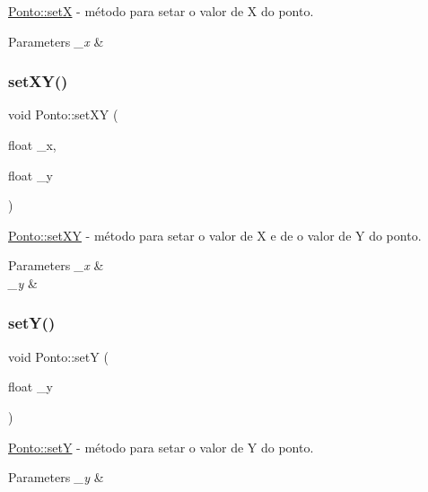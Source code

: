 \hyperlink{classPonto_a22129ad4dbf8019c479021d70a9f6774}{Ponto\+::setX} -\/ método para setar o valor de X do ponto. 


\begin{DoxyParams}{Parameters}
{\em \+\_\+x} & \\
\hline
\end{DoxyParams}
\mbox{\label{classPonto_a827488219a7da184d440f687cec49ce6}} 
\subsubsection{\texorpdfstring{set\+X\+Y()}{setXY()}}
{\footnotesize\ttfamily void Ponto\+::set\+XY (\begin{DoxyParamCaption}\item[{float}]{\+\_\+x,  }\item[{float}]{\+\_\+y }\end{DoxyParamCaption})}



\hyperlink{classPonto_a827488219a7da184d440f687cec49ce6}{Ponto\+::set\+XY} -\/ método para setar o valor de X e de o valor de Y do ponto. 


\begin{DoxyParams}{Parameters}
{\em \+\_\+x} & \\
\hline
{\em \+\_\+y} & \\
\hline
\end{DoxyParams}
\mbox{\label{classPonto_a2d9e5b9fade9d3f3f21122a2dc2f5e11}} 
\subsubsection{\texorpdfstring{set\+Y()}{setY()}}
{\footnotesize\ttfamily void Ponto\+::setY (\begin{DoxyParamCaption}\item[{float}]{\+\_\+y }\end{DoxyParamCaption})}



\hyperlink{classPonto_a2d9e5b9fade9d3f3f21122a2dc2f5e11}{Ponto\+::setY} -\/ método para setar o valor de Y do ponto. 


\begin{DoxyParams}{Parameters}
{\em \+\_\+y} & \\
\hline
\end{DoxyParams}
\mbox{\label{classPonto_a8404fcad0fca2ce768ab9e1550f5d3a0}} 
